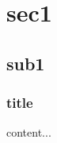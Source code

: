 \documentclass[compress]{beamer}
\begin{document}
\section{sec1}
\subsection{sub1}
\begin{frame}
\frametitle{title}
content...
\end{frame}
\end{document}
